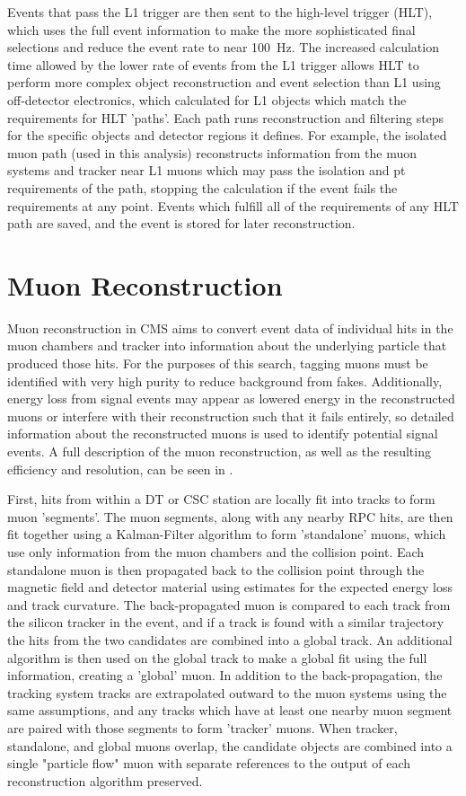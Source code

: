 Events that pass the L1 trigger are then sent to the high-level trigger (HLT), which uses the full event information to make the more sophisticated final selections and reduce the event rate to near \SI{100}{\hertz}.
The increased calculation time allowed by the lower rate of events from the L1 trigger allows HLT to perform more complex object reconstruction and event selection than L1 using off-detector electronics, which calculated for L1 objects which match the requirements for HLT 'paths'.
Each path runs reconstruction and filtering steps for the specific objects and detector regions it defines.
For example, the isolated muon path (used in this analysis) reconstructs information from the muon systems and tracker near L1 muons which may pass the isolation and pt requirements of the path, stopping the calculation if the event fails the requirements at any point.
Events which fulfill all of the requirements of any HLT path are saved, and the event is stored for later reconstruction.

\section{Muon Reconstruction}
Muon reconstruction in CMS aims to convert event data of individual hits in the muon chambers and tracker into information about the underlying particle that produced those hits.
For the purposes of this search, tagging muons must be identified with very high purity to reduce background from fakes. 
Additionally, energy loss from signal events may appear as lowered energy in the reconstructed muons or interfere with their reconstruction such that it fails entirely, so detailed information about the reconstructed muons is used to identify potential signal events.
A full description of the muon reconstruction, as well as the resulting efficiency and resolution, can be seen in \cite{Sirunyan2018}.

First, hits from within a DT or CSC station are locally fit into tracks to form muon 'segments'.
The muon segments, along with any nearby RPC hits, are then fit together using a Kalman-Filter algorithm to form 'standalone' muons, which use only information from the muon chambers and the collision point.
Each standalone muon is then propagated back to the collision point through the magnetic field and detector material using estimates for the expected energy loss and track curvature.
The back-propagated muon is compared to each track from the silicon tracker in the event, and if a track is found with a similar trajectory the hits from the two candidates are combined into a global track.
An additional \kf algorithm is then used on the global track to make a global fit using the full information, creating a 'global' muon. 
In addition to the back-propagation, the tracking system tracks are extrapolated outward to the muon systems using the same assumptions, and any tracks which have at least one nearby muon segment are paired with those segments to form 'tracker' muons. 
When tracker, standalone, and global muons overlap, the candidate objects are combined into a single "particle flow" muon with separate references to the output of each reconstruction algorithm preserved.

